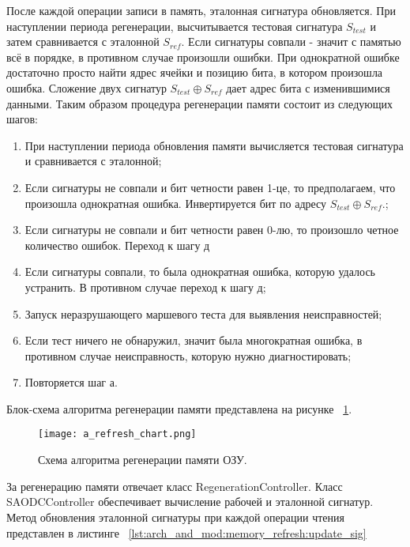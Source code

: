 После каждой операции записи в память, эталонная сигнатура обновляется. При наступлении периода регенерации, высчитывается тестовая сигнатура $S_{test}$ и затем сравнивается с эталонной $S_{ref}$. Если сигнатуры совпали - значит с памятью всё в порядке, в противном случае произошли ошибки. При однократной ошибке достаточно просто найти ядрес ячейки и позицию бита, в котором произошла ошибка. Сложение двух сигнатур  $S_{test} \oplus S_{ref}$ дает адрес бита с изменившимися данными. Таким образом процедура регенерации памяти состоит из следующих шагов:
\begin{enumerate}
  \item При наступлении периода обновления памяти вычисляется тестовая сигнатура и сравнивается с эталонной;
  \item Если сигнатуры не совпали и бит четности равен 1-це, то предполагаем, что произошла однократная ошибка. Инвертируется бит по адресу $S_{test} \oplus S_{ref}$.;
  \item Если сигнатуры не совпали и бит четности равен 0-лю, то произошло четное количество ошибок. Переход к шагу д
  \item Если сигнатуры совпали, то была однократная ошибка, которую удалось устранить. В противном случае переход к шагу д;
  \item Запуск неразрушающего маршевого теста для выявления неисправностей;
  \item Если тест ничего не обнаружил, значит была многократная ошибка, в противном случае неисправность, которую нужно диагностировать;
  \item Повторяется шаг а.
\end{enumerate}

Блок-схема алгоритма регенерации памяти представлена на рисунке ~\ref{fig:arch_and_mod:memory_refresh:refresh_chart}.

\begin{figure}[ht]
\centering
  \texttt{[image: a\_refresh\_chart.png]}  
  \caption{ Схема алгоритма регенерации памяти ОЗУ.}
  \label{fig:arch_and_mod:memory_refresh:refresh_chart}
\end{figure}

За регенерацию памяти отвечает класс RegenerationController. Класс SAODCController обеспечивает вычисление рабочей и эталонной сигнатур. Метод обновления эталонной сигнатуры при каждой операции чтения представлен в листинге ~\ref{lst:arch_and_mod:memory_refresh:update_sig}

